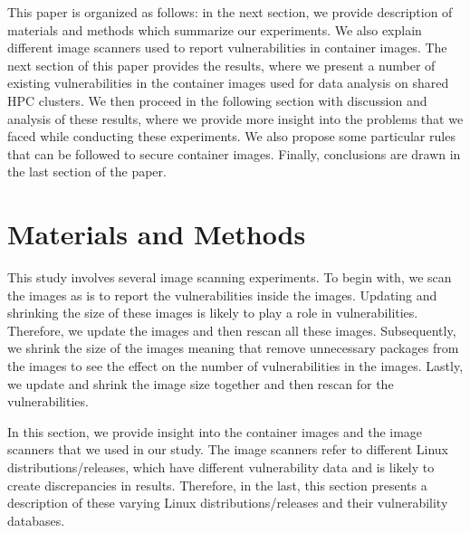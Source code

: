 \documentclass[a4paper,num-refs]{oup-contemporary}
\begin{document}
This paper is organized as follows: in the next section, we provide description
of materials and methods which summarize our experiments. We also explain different
image scanners used to report
vulnerabilities in container images. The next section of this paper provides the results, where we
present a number of existing vulnerabilities in the container images
used for data analysis on shared HPC clusters. We then proceed in the following section with 
discussion and analysis of these results, where we provide more insight into the problems that 
we faced while conducting these experiments. We also propose some
particular rules that can be followed to secure container images. Finally, conclusions are drawn
in the last section of the paper.

\section{Materials and Methods}

This study involves several image scanning experiments. To begin with,
we scan the images as is to report the vulnerabilities
inside the images. Updating and shrinking the size of these images is likely to play a role in vulnerabilities. Therefore, we
update the images and then rescan all these
images.
Subsequently, we shrink the size of the images
meaning that remove unnecessary packages from the images to see the effect on the number of
vulnerabilities in the images.
Lastly, we update and shrink the image size together and then
rescan for the vulnerabilities.

In this section, we provide
insight
into the container images and the image scanners that we used in our study.
The image scanners refer to different Linux
distributions/releases, which have different vulnerability data and is likely to
create discrepancies in results. Therefore, in the last, this section presents a
description of these varying Linux distributions/releases and their
vulnerability databases.

\end{document}
